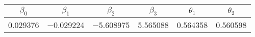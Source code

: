 \centering
\begin{tabular}{cccccc}
  \toprule
  $\beta_0$ & $\beta_1$ & $\beta_2$ & $\beta_3$ & $\theta_1$ & $\theta_2$ \\
  \midrule
  \num{0.029376} & \num{-0.029224} & \num{-5.608975} &
                                                       \num{5.565088} & \num{0.564358}
                                                             &
                                                               \num{ 0.560598}\\

\bottomrule
\end{tabular}